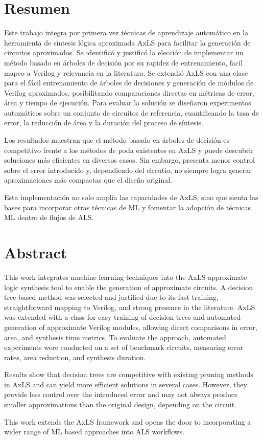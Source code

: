 \chapter*{Resumen}

Este trabajo integra por primera vez técnicas de aprendizaje automático en la
herramienta de síntesis lógica aproximada AxLS para facilitar la generación de
circuitos aproximados. Se identificó y justificó la elección de implementar un
método basado en árboles de decisión por su rapidez de entrenamiento, facil
mapeo a Verilog y relevancia en la literatura. Se extendió AxLS con una clase
para el fácil entrenamiento de árboles de decisiones y generación de módulos de
Verilog aproximados, posibilitando comparaciones directas en métricas de error,
área y tiempo de ejecución. Para evaluar la solución se diseñaron experimentos
automáticos sobre un conjunto de circuitos de referencia, cuantificando la tasa
de error, la reducción de área y la duración del proceso de síntesis.

Los resultados muestran que el método basado en árboles de decisión es
competitivo frente a los métodos de poda existentes en AxLS y puede descubrir
soluciones más eficientes en diversos casos. Sin embargo, presenta menor
control sobre el error introducido y, dependiendo del circutio, no siempre
logra generar aproximaciones más compactas que el diseño original.

Esta implementación no solo amplía las capacidades de AxLS, sino que sienta las
bases para incorporar otras técnicas de ML y fomentar la adopción de técnicas
ML dentro de flujos de ALS.


\chapter*{Abstract}

This work integrates machine learning techniques into the AxLS approximate
logic synthesis tool to enable the generation of approximate circuits. A
decision tree based method was selected and justified due to its fast training,
straightforward mapping to Verilog, and strong presence in the literature. AxLS
was extended with a class for easy training of decision trees and automated
generation of approximate Verilog modules, allowing direct comparisons in
error, area, and synthesis time metrics. To evaluate the approach, automated
experiments were conducted on a set of benchmark circuits, measuring error
rates, area reduction, and synthesis duration.

Results show that decision trees are competitive with existing pruning methods
in AxLS and can yield more efficient solutions in several cases. However, they
provide less control over the introduced error and may not always produce
smaller approximations than the original design, depending on the circuit.

This work extends the AxLS framework and opens the door to incorporating a
wider range of ML based approaches into ALS workflows.
